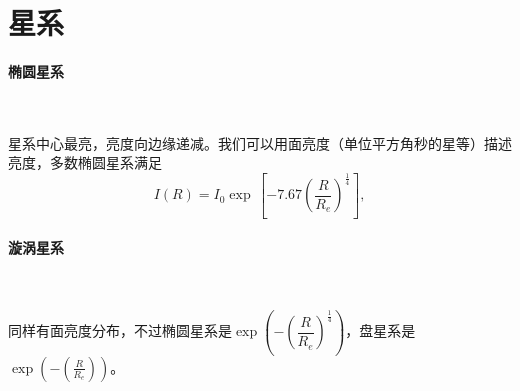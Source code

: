 \documentclass[../天体物理基础.tex]{subfiles}
\begin{document}
\section{星系}
\paragraph{椭圆星系}~{}

星系中心最亮，亮度向边缘递减。我们可以用面亮度（单位平方角秒的星等）描述亮度，多数椭圆星系满足
\begin{equation}
I(R)=I_{0}\exp\,[-7.67(\frac{R}{R_{e}})^{\frac14}],
\end{equation}

\paragraph{漩涡星系}~{}


同样有面亮度分布，不过椭圆星系是$\exp\left(-\left(\dfrac{R}{R_{e}}\right)^{\frac14}\right)$，盘星系是$\exp\left(-\left(\frac{R}{R_{e}}\right)\right)$。


\printbibliography
\end{document}
